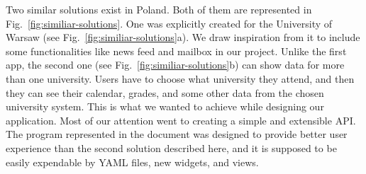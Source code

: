 Two similar solutions exist in Poland. Both of them are represented in Fig.~\ref{fig:similiar-solutions}. One was explicitly created for the University of Warsaw (see Fig.~\ref{fig:similiar-solutions}a). We draw inspiration from it to include some functionalities like news feed and mailbox in our project. Unlike the first app, the second one (see Fig.~\ref{fig:similiar-solutions}b) can show data for more than one university. Users have to choose what university they attend, and then they can see their calendar, grades, and some other data from the chosen university system. This is what we wanted to achieve while designing our application. Most of our attention went to creating a simple and extensible API. The program represented in the document was designed to provide better user experience than the second solution described here, and it is supposed to be easily expendable by YAML files, new widgets, and views.

